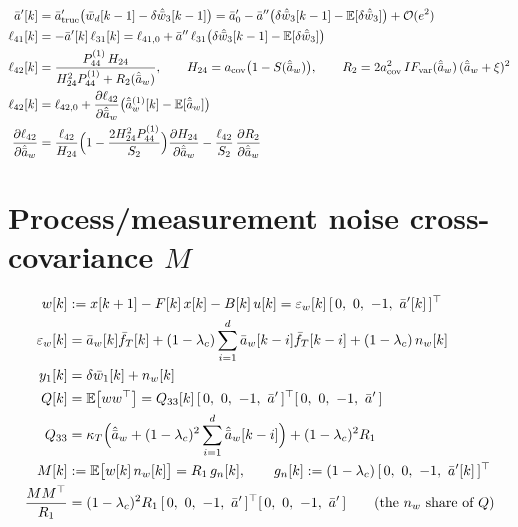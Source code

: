 \documentclass[11pt,a4paper,fontset=none]{ctexart}
\newcommand{\ba}{\bar{a}}
\newcommand{\bw}{\bar{w}}
\newcommand{\E}{\mathbb{E}}
\begin{document}
\begin{align*}
\ba'[k] &= \ba'_{\mathrm{true}}\bigl(\bw_d[k-1] - \delta\hat{\bw}_3[k-1]\bigr)
        = \ba'_0 - \ba''\bigl(\delta\hat{\bw}_3[k-1] - \E[\delta\hat{\bw}_3]\bigr) + \mathcal{O}(e^{2}) \\
\ell_{41}[k] &= -\ba'[k]\,\ell_{31}[k]
        = \ell_{41,0} + \ba''\,\ell_{31}\bigl(\delta\hat{\bw}_3[k-1] - \E[\delta\hat{\bw}_3]\bigr) \\
\ell_{42}[k] &= \frac{P^{(1)}_{44}\,H_{24}}{H_{24}^{2}P^{(1)}_{44} + R_2(\hat{\ba}_w)} , \qquad
   H_{24} = a_{\mathrm{cov}}\bigl(1 - S(\hat{\ba}_w)\bigr) , \qquad
   R_2 = 2a_{\mathrm{cov}}^{2}\,IF_{\mathrm{var}}(\hat{\ba}_w)\,(\hat{\ba}_w + \xi)^{2} \\
\ell_{42}[k] &= \ell_{42,0} + \frac{\partial\ell_{42}}{\partial\hat{\ba}_w}\bigl(\hat{\ba}^{(1)}_w[k] - \E[\hat{\ba}_w]\bigr) \\
\frac{\partial\ell_{42}}{\partial\hat{\ba}_w}
  &= \frac{\ell_{42}}{H_{24}}\Bigl(1 - \frac{2H_{24}^{2}P^{(1)}_{44}}{S_2}\Bigr)\frac{\partial H_{24}}{\partial\hat{\ba}_w}
  - \frac{\ell_{42}}{S_2}\,\frac{\partial R_2}{\partial\hat{\ba}_w}
\end{align*}

\section{Process/measurement noise cross-covariance $M$}

\begin{align*}
w[k] &:= x[k+1] - F[k]\,x[k] - B[k]\,u[k] = \varepsilon_w[k]\,[\,0,\ 0,\ -1,\ \ba'[k]\,]^{\top} \\
\varepsilon_w[k] &= \ba_w[k]\bar{f}_T[k] + (1-\lambda_c)\sum_{i=1}^{d}\ba_w[k-i]\bar{f}_T[k-i] + (1-\lambda_c)\,n_w[k] \\
y_1[k] &= \delta\bw_1[k] + n_w[k] \\
Q[k] &= \E\bigl[w w^{\top}\bigr] = Q_{33}[k]\,[\,0,\ 0,\ -1,\ \ba'\,]^{\top}[\,0,\ 0,\ -1,\ \ba'\,] \\
Q_{33} &= \kappa_T\Bigl(\hat{\ba}_w + (1-\lambda_c)^{2}\sum_{i=1}^{d}\hat{\ba}_w[k-i]\Bigr) + (1-\lambda_c)^{2}R_1 \\
M[k] &:= \E\bigl[w[k]\,n_w[k]\bigr] = R_1\,g_n[k] , \qquad g_n[k] := (1-\lambda_c)\,[\,0,\ 0,\ -1,\ \ba'[k]\,]^{\top} \\
\frac{M M^{\top}}{R_1} &= (1-\lambda_c)^{2}R_1\,[\,0,\ 0,\ -1,\ \ba'\,]^{\top}[\,0,\ 0,\ -1,\ \ba'\,] \qquad \text{(the $n_w$ share of $Q$)}
\end{align*}
\end{document}
